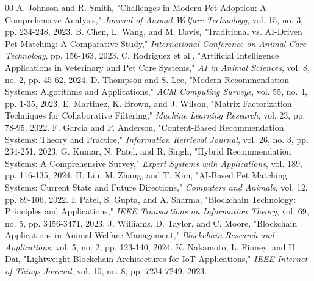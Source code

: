 \documentclass[conference]{IEEEtran}
\begin{document}
\begin{thebibliography}{00}
 A. Johnson and R. Smith, "Challenges in Modern Pet Adoption: A Comprehensive Analysis," \textit{Journal of Animal Welfare Technology}, vol. 15, no. 3, pp. 234-248, 2023.
 B. Chen, L. Wang, and M. Davis, "Traditional vs. AI-Driven Pet Matching: A Comparative Study," \textit{International Conference on Animal Care Technology}, pp. 156-163, 2023.
 C. Rodriguez et al., "Artificial Intelligence Applications in Veterinary and Pet Care Systems," \textit{AI in Animal Sciences}, vol. 8, no. 2, pp. 45-62, 2024.
 D. Thompson and S. Lee, "Modern Recommendation Systems: Algorithms and Applications," \textit{ACM Computing Surveys}, vol. 55, no. 4, pp. 1-35, 2023.
 E. Martinez, K. Brown, and J. Wilson, "Matrix Factorization Techniques for Collaborative Filtering," \textit{Machine Learning Research}, vol. 23, pp. 78-95, 2022.
 F. Garcia and P. Anderson, "Content-Based Recommendation Systems: Theory and Practice," \textit{Information Retrieval Journal}, vol. 26, no. 3, pp. 234-251, 2023.
 G. Kumar, N. Patel, and R. Singh, "Hybrid Recommendation Systems: A Comprehensive Survey," \textit{Expert Systems with Applications}, vol. 189, pp. 116-135, 2024.
 H. Liu, M. Zhang, and T. Kim, "AI-Based Pet Matching Systems: Current State and Future Directions," \textit{Computers and Animals}, vol. 12, pp. 89-106, 2022.
 I. Patel, S. Gupta, and A. Sharma, "Blockchain Technology: Principles and Applications," \textit{IEEE Transactions on Information Theory}, vol. 69, no. 5, pp. 3456-3471, 2023.
 J. Williams, D. Taylor, and C. Moore, "Blockchain Applications in Animal Welfare Management," \textit{Blockchain Research and Applications}, vol. 5, no. 2, pp. 123-140, 2024.
 K. Nakamoto, L. Finney, and H. Dai, "Lightweight Blockchain Architectures for IoT Applications," \textit{IEEE Internet of Things Journal}, vol. 10, no. 8, pp. 7234-7249, 2023.
\end{thebibliography}
\end{document}
